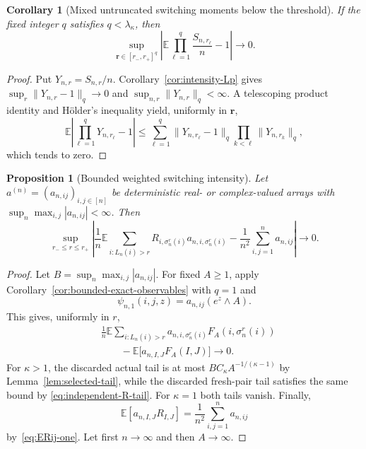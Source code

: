 \documentclass[11pt]{article}
\newcommand{\E}{\mathbb E}
\newcommand{\1}{\mathbf 1}
\newtheorem{proposition}[theorem]{Proposition}
\newtheorem{corollary}[theorem]{Corollary}
\theoremstyle{definition}
\theoremstyle{remark}
\begin{document}
\begin{corollary}[Mixed untruncated switching moments below the threshold]
\label{cor:mixed-untruncated-moments}
If the fixed integer $q$ satisfies $q<\lambda_\kappa$, then
\begin{equation}\label{eq:mixed-untruncated-moments}
 \sup_{\mathbf r\in[r_-,r_+]^q}
 \left|
  \E\prod_{\ell=1}^q\frac{S_{n,r_\ell}}n-1
 \right|
 \longrightarrow0.
\end{equation}
\end{corollary}

\begin{proof}
Put $Y_{n,r}=S_{n,r}/n$.  Corollary~\ref{cor:intensity-Lp} gives
$\sup_r\|Y_{n,r}-1\|_q\to0$ and
$\sup_{n,r}\|Y_{n,r}\|_q<\infty$.  A telescoping product identity and
H\"older's inequality yield, uniformly in $\mathbf r$,
\[
 \E\left|\prod_{\ell=1}^qY_{n,r_\ell}-1\right|
 \leq\sum_{\ell=1}^q
 \|Y_{n,r_\ell}-1\|_q
 \prod_{k<\ell}\|Y_{n,r_k}\|_q,
\]
which tends to zero.
\end{proof}

\begin{proposition}[Bounded weighted switching intensity]
\label{prop:weighted-switching}
Let $a^{(n)}=(a_{n,ij})_{i,j\in[n]}$ be deterministic real- or
complex-valued arrays with
$\sup_n\max_{i,j}|a_{n,ij}|<\infty$.  Then
\begin{equation}\label{eq:weighted-switching}
 \sup_{r_-\leq r\leq r_+}
 \left|
  \frac1n\E\sum_{i:L_n(i)>r}
   R_{i,\sigma_n^r(i)}a_{n,i,\sigma_n^r(i)}
  -\frac1{n^2}\sum_{i,j=1}^na_{n,ij}
 \right|
 \longrightarrow0.
\end{equation}
\end{proposition}

\begin{proof}
Let $B=\sup_n\max_{i,j}|a_{n,ij}|$.  For fixed $A\geq1$, apply
Corollary~\ref{cor:bounded-exact-observables} with $q=1$ and
\[
 \psi_{n,1}(i,j,z)=a_{n,ij}(e^z\wedge A).
\]
This gives, uniformly in $r$,
\begin{align*}
 &\frac1n\E\sum_{i:L_n(i)>r}
  a_{n,i,\sigma_n^r(i)}F_A(i,\sigma_n^r(i))\\
 &\qquad-\E\bigl[a_{n,I,J}F_A(I,J)\bigr]\longrightarrow0.
\end{align*}
For $\kappa>1$, the discarded actual tail is at most
$BC_\kappa A^{-1/(\kappa-1)}$ by Lemma~\ref{lem:selected-tail}, while
the discarded fresh-pair tail satisfies the same bound by
\eqref{eq:independent-R-tail}.  For $\kappa=1$ both tails vanish.
Finally,
\[
 \E[a_{n,I,J}R_{I,J}]
 =\frac1{n^2}\sum_{i,j=1}^na_{n,ij}
\]
by~\eqref{eq:ERij-one}.  Let first $n\to\infty$ and then
$A\to\infty$.
\end{proof}
\end{document}
